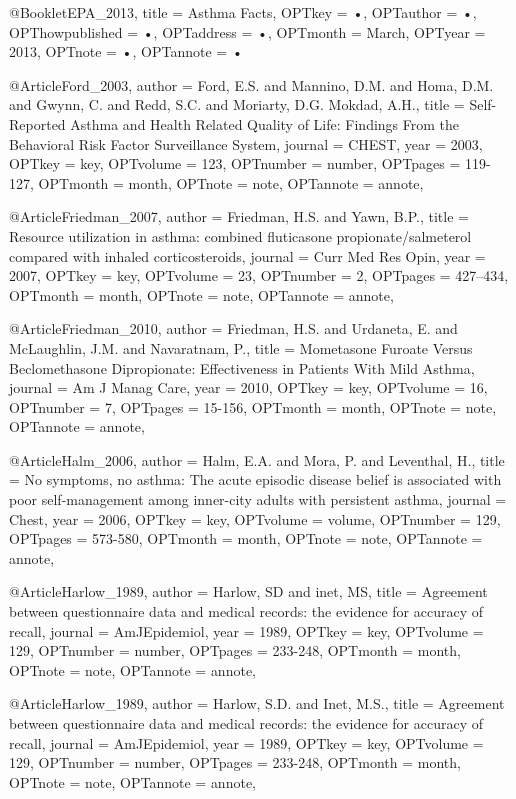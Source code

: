 {{@Booklet{EPA_2013,
title = {Asthma Facts},
OPTkey = {•},
OPTauthor = {•},
OPThowpublished = {•},
OPTaddress = {•},
OPTmonth = {March},
OPTyear = {2013},
OPTnote = {•},
OPTannote = {•}
}



@Article{Ford_2003,
author = {Ford, E.S. and Mannino, D.M. and Homa, D.M. and Gwynn, C. and Redd, S.C. and Moriarty, D.G. Mokdad, A.H.},
title = {Self-Reported Asthma and Health Related Quality of Life: Findings From the Behavioral Risk Factor Surveillance System},
journal = {CHEST},
year = {2003},
OPTkey = {key},
OPTvolume = {123},
OPTnumber = {number},
OPTpages = {119-127},
OPTmonth = {month},
OPTnote = {note},
OPTannote = {annote},
}

@Article{Friedman_2007,
author = {Friedman, H.S. and Yawn, B.P.},
title = {Resource utilization in asthma:
combined fluticasone propionate/salmeterol compared with inhaled corticosteroids},
journal = {Curr Med Res Opin},
year = {2007},
OPTkey = {key},
OPTvolume = {23},
OPTnumber = {2},
OPTpages = {427–434},
OPTmonth = {month},
OPTnote = {note},
OPTannote = {annote},
}


@Article{Friedman_2010,
author = {Friedman, H.S. and Urdaneta, E. and McLaughlin, J.M. and Navaratnam, P.},
title = {Mometasone Furoate Versus Beclomethasone Dipropionate: Effectiveness in Patients With Mild Asthma},
journal = {Am J Manag Care},
year = {2010},
OPTkey = {key},
OPTvolume = {16},
OPTnumber = {7},
OPTpages = {15-156},
OPTmonth = {month},
OPTnote = {note},
OPTannote = {annote},
}



@Article{Halm_2006,
author = {Halm, E.A. and Mora, P. and Leventhal, H.},
title = {No symptoms, no asthma: The acute episodic disease belief is associated with poor self-management among inner-city adults with persistent asthma},
journal = {Chest},
year = {2006},
OPTkey = {key},
OPTvolume = {volume},
OPTnumber = {129},
OPTpages = {573-580},
OPTmonth = {month},
OPTnote = {note},
OPTannote = {annote},
}

@Article{Harlow_1989,
author = {Harlow, SD and inet, MS},
title = {Agreement between questionnaire data and medical records: the evidence for accuracy of recall},
journal = {AmJEpidemiol},
year = {1989},
OPTkey = {key},
OPTvolume = {129},
OPTnumber = {number},
OPTpages = {233-248},
OPTmonth = {month},
OPTnote = {note},
OPTannote = {annote},
}

@Article{Harlow_1989,
author = {Harlow, S.D. and Inet, M.S.},
title = {Agreement between questionnaire data and medical records: the evidence for accuracy of recall},
journal = {AmJEpidemiol},
year = {1989},
OPTkey = {key},
OPTvolume = {129},
OPTnumber = {number},
OPTpages = {233-248},
OPTmonth = {month},
OPTnote = {note},
OPTannote = {annote},
}

}}
